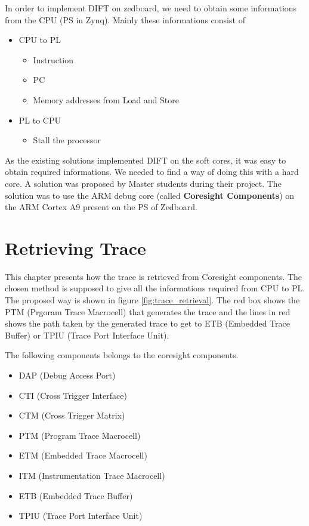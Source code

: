 \documentclass[10pt,a4paper, oneside]{memoir}
\begin{document}
In order to implement DIFT on zedboard, we need to obtain some informations from the CPU (PS in Zynq). Mainly these informations consist of
\begin{itemize}
\item CPU to PL 
\begin{itemize}
\item Instruction 
\item PC 
\item Memory addresses from Load and Store 
\end{itemize}
\item PL to CPU 
\begin{itemize}
\item Stall the processor
\end{itemize}
\end{itemize}

As the existing solutions implemented DIFT on the soft cores, it was easy to obtain required informations. We needed to find a way of doing this with a hard core. A solution was proposed by Master students during their project. The solution was to use the ARM debug core (called \textbf{Coresight Components}) on the ARM Cortex A9 present on the PS of Zedboard. 


\chapter{Retrieving Trace}
This chapter presents how the trace is retrieved from Coresight components. 
The chosen method is supposed to give all the informations required from CPU to PL. The proposed way is shown in figure \ref{fig:trace_retrieval}. The red box shows the PTM (Prgoram Trace Macrocell) that generates the trace and the lines in red shows the path taken by the generated trace to get to ETB (Embedded Trace Buffer) or TPIU (Trace Port Interface Unit). 

The following components belongs to the coresight components.

\begin{itemize}
\item DAP (Debug Access Port)
\item CTI (Cross Trigger Interface)
\item CTM (Cross Trigger Matrix)
\item PTM (Program Trace Macrocell) 
\item ETM (Embedded Trace Macrocell)
\item ITM (Instrumentation Trace Macrocell)
\item ETB (Embedded Trace Buffer)
\item TPIU (Trace Port Interface Unit)
\end{itemize}
\end{document}
